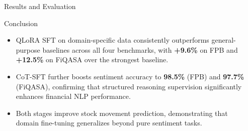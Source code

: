 \documentclass[final]{beamer}
\newlength{\sepwidth}
\newlength{\colwidth}
\newcommand{\separatorcolumn}{\begin{column}{\sepwidth}\end{column}}
\begin{document}
\begin{frame}[t]
\begin{columns}[t]
\begin{column}{\colwidth}
\begin{block}{Results and Evaluation}
  \end{block}

  \begin{alertblock}{Conclusion}

    \begin{itemize}
      \item QLoRA SFT on domain-specific data consistently outperforms
        general-purpose baselines across all four benchmarks, with
        \textbf{+9.6\%} on FPB and \textbf{+12.5\%} on FiQASA over the
        strongest baseline.
      \item CoT-SFT further boosts sentiment accuracy to
        \textbf{98.5\%} (FPB) and \textbf{97.7\%} (FiQASA), confirming
        that structured reasoning supervision significantly enhances
        financial NLP performance.
      \item Both stages improve stock movement prediction, demonstrating
        that domain fine-tuning generalizes beyond pure sentiment tasks.
    \end{itemize}

  \end{alertblock}


\end{column}

\separatorcolumn
\end{columns}
\end{frame}
\end{document}
